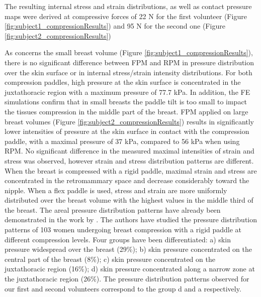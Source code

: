 The resulting internal stress and strain distributions, as well as contact pressure maps were derived at compressive forces of 22 N for the first volunteer (Figure \ref{fig:subject1_compressionResults}) and 95 N for the second one (Figure \ref{fig:subject2_compressionResults})


As concerns the small breast volume (Figure \ref{fig:subject1_compressionResults}), there is no significant difference between FPM and RPM in pressure distribution over the skin surface or in internal stress/strain intensity distributions. For both compression paddles, high pressure at the skin surface is concentrated in the juxtathoracic region with a maximum pressure of 77.7 kPa. In addition, the FE simulations confirm that in small breasts the paddle tilt is too small to impact the tissues compression in the middle part of the breast. 
FPM applied on large breast volumes (Figure \ref{fig:subject2_compressionResults}) results in significantly lower intensities of pressure at the skin surface in contact with the compression paddle, with a maximal pressure of 37 kPa, compared to 56 kPa when using RPM. No significant difference in the measured maximal intensities of strain and stress was observed, however strain and stress distribution patterns are different. When the breast is compressed with a rigid paddle, maximal strain and stress are concentrated in the retromammary space and decrease considerably toward the nipple. When a flex paddle is used, stress and strain are more uniformly distributed over the breast volume with the highest values in the middle third of the breast.
The areal pressure distribution patterns have already been demonstrated in the work by \cite{dustler_breast_2012}. The authors have studied the pressure distribution patterns of 103 women undergoing breast compression with a rigid paddle at different compression levels. Four groups have been differentiated: a) skin pressure widespread over the breast (29\%); b) skin pressure concentrated on the central part of the breast (8\%); c) skin pressure concentrated on the juxtathoracic region (16\%); d) skin pressure concentrated along a narrow zone at the juxtathoracic region (26\%).  The pressure distribution patterns observed for our first and second volunteers correspond to the group d and a respectively.


